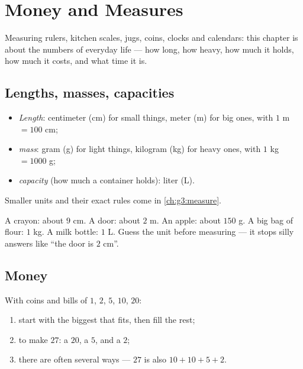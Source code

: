 \chapter{Money and Measures}\label{ch:g2:measure}

Measuring rulers, kitchen scales, jugs, coins, clocks and
calendars: this chapter is about the numbers of everyday life ---
how long, how heavy, how much it holds, how much it costs, and what
time it is.

\section{Lengths, masses, capacities}

\begin{definition}\label{def:g2:measure:units}
\begin{itemize}
  \item \emph{Length}: centimeter (cm) for small things, meter (m)
        for big ones, with $1$ m $= 100$ cm;
  \item \emph{mass}: gram (g) for light things, kilogram (kg) for
        heavy ones, with $1$ kg $= 1000$ g;
  \item \emph{capacity} (how much a container holds): liter (L).
\end{itemize}
Smaller units and their exact rules come in \cref{ch:g3:measure}.
\end{definition}

\begin{example}\label{ex:g2:measure:choose}
A crayon: about $9$ cm. A door: about $2$ m. An apple: about $150$
g. A big bag of flour: $1$ kg. A milk bottle: $1$ L. Guess the unit
before measuring --- it stops silly answers like ``the door is $2$
cm''.
\end{example}

\section{Money}

\begin{method}\label{met:g2:measure:money}
With coins and bills of $1$, $2$, $5$, $10$, $20$:
\begin{enumerate}
  \item start with the biggest that fits, then fill the rest;
  \item to make $27$: a $20$, a $5$, and a $2$;
  \item there are often several ways --- $27$ is also $10 + 10 + 5 +
        2$.
\end{enumerate}
\end{method}

